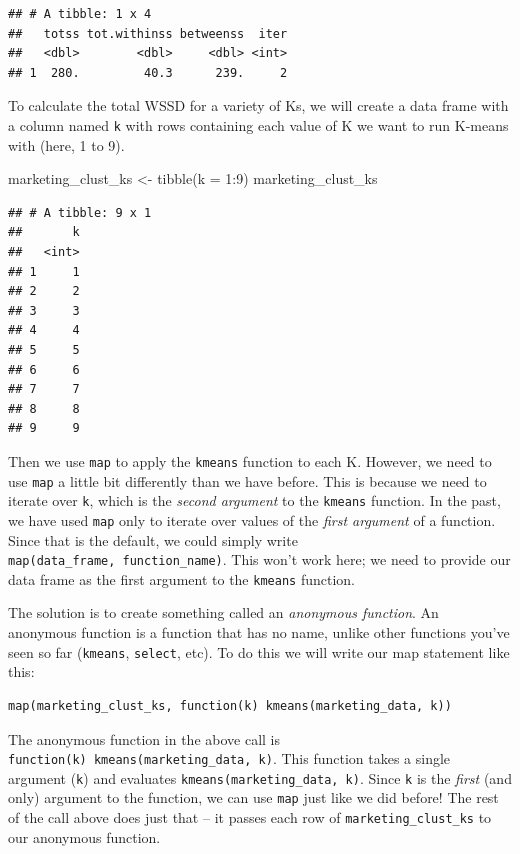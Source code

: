 \documentclass[
]{krantz}
\makeatletter
\newenvironment{Shaded}{\begin{snugshade}}{\end{snugshade}}
\newcommand{\AttributeTok}[1]{\textcolor[rgb]{0.61,0.61,0.61}{#1}}
\newcommand{\DecValTok}[1]{\textcolor[rgb]{0.06,0.06,0.06}{#1}}
\newcommand{\FunctionTok}[1]{\textcolor[rgb]{0,0,0}{#1}}
\newcommand{\NormalTok}[1]{#1}
\newcommand{\OtherTok}[1]{\textcolor[rgb]{0.37,0.37,0.37}{#1}}
\newcommand{\SpecialCharTok}[1]{\textcolor[rgb]{0,0,0}{#1}}
\newenvironment{kframe}{%
\medskip{}
\setlength{\fboxsep}{.8em}
 \def\at@end@of@kframe{}%
 \ifinner\ifhmode%
  \def\at@end@of@kframe{\end{minipage}}%
  \begin{minipage}{\columnwidth}%
 \fi\fi%
 \def\FrameCommand##1{\hskip\@totalleftmargin \hskip-\fboxsep
 \colorbox{shadecolor}{##1}\hskip-\fboxsep
     \hskip-\linewidth \hskip-\@totalleftmargin \hskip\columnwidth}%
 \MakeFramed {\advance\hsize-\width
   \@totalleftmargin\z@ \linewidth\hsize
   \@setminipage}}%
 {\par\unskip\endMakeFramed%
 \at@end@of@kframe}
\renewenvironment{Shaded}{\begin{kframe}}{\end{kframe}}
\makeatother
\begin{document}
\begin{verbatim}
## # A tibble: 1 x 4
##   totss tot.withinss betweenss  iter
##   <dbl>        <dbl>     <dbl> <int>
## 1  280.         40.3      239.     2
\end{verbatim}

To calculate the total WSSD for a variety of Ks, we will
create a data frame with a column named \texttt{k} with rows containing
each value of K we want to run K-means with (here, 1 to 9).

\begin{Shaded}
\begin{Highlighting}[]
\NormalTok{marketing\_clust\_ks }\OtherTok{\textless{}{-}} \FunctionTok{tibble}\NormalTok{(}\AttributeTok{k =} \DecValTok{1}\SpecialCharTok{:}\DecValTok{9}\NormalTok{) }
\NormalTok{marketing\_clust\_ks}
\end{Highlighting}
\end{Shaded}

\begin{verbatim}
## # A tibble: 9 x 1
##       k
##   <int>
## 1     1
## 2     2
## 3     3
## 4     4
## 5     5
## 6     6
## 7     7
## 8     8
## 9     9
\end{verbatim}

Then we use \texttt{map} to apply the \texttt{kmeans} function to each
K. However, we need to use \texttt{map} a little bit differently than we have
before. This is because we need to iterate over \texttt{k}, which is the \emph{second argument}
to the \texttt{kmeans} function. In the past, we have used \texttt{map} only to iterate over values of the
\emph{first argument} of a function. Since that is the default, we could simply
write \texttt{map(data\_frame,\ function\_name)}. This won't work here; we need to
provide our data frame as the first argument to the \texttt{kmeans} function.

The solution is to create something called an \emph{anonymous function}.
An anonymous function is a function that has no name,
unlike other functions you've seen so far (\texttt{kmeans}, \texttt{select}, etc).
To do this we will write our map statement like this:

\begin{verbatim}
map(marketing_clust_ks, function(k) kmeans(marketing_data, k))
\end{verbatim}

The anonymous function in the above call is \texttt{function(k)\ kmeans(marketing\_data,\ k)}.
This function takes a single argument (\texttt{k}) and evaluates \texttt{kmeans(marketing\_data,\ k)}.
Since \texttt{k} is the \emph{first} (and only) argument to the function, we can use \texttt{map} just
like we did before! The rest of the call above does just that -- it passes each row of
\texttt{marketing\_clust\_ks} to our anonymous function.
\end{document}
